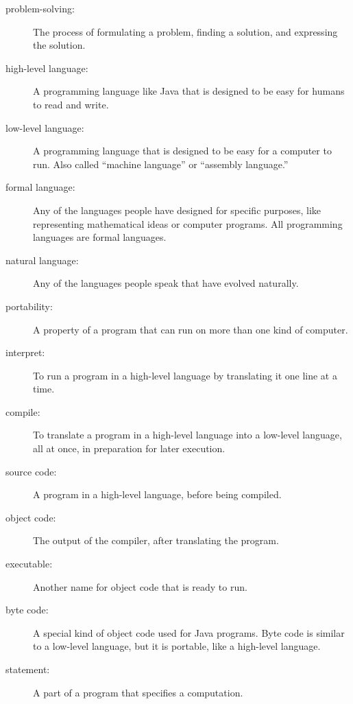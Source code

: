 \documentclass[12pt]{book}
\theoremstyle{exercise}
\begin{document}
\begin{description}

\item[problem-solving:]  The process of formulating a problem, finding
a solution, and expressing the solution.

\item[high-level language:]  A programming language like Java that
is designed to be easy for humans to read and write.

\item[low-level language:]  A programming language that is designed
to be easy for a computer to run.  Also called ``machine
language'' or ``assembly language.''

\item[formal language:]  Any of the languages people have designed
for specific purposes, like representing mathematical ideas or
computer programs.  All programming languages are formal languages.

\item[natural language:]  Any of the languages people speak that
have evolved naturally.

\item[portability:]  A property of a program that can run on more
than one kind of computer.

\item[interpret:]  To run a program in a high-level language
by translating it one line at a time.

\item[compile:]  To translate a program in a high-level language
into a low-level language, all at once, in preparation for later
execution.

\item[source code:]  A program in a high-level language, before
being compiled.

\item[object code:]  The output of the compiler, after translating
the program.

\item[executable:]  Another name for object code that is ready
to run.

\item[byte code:]  A special kind of object code used for Java
programs.  Byte code is similar to a low-level language, but it is
portable, like a high-level language.

\item[statement:] A part of a program that specifies a computation.


\end{description}
\end{document}
